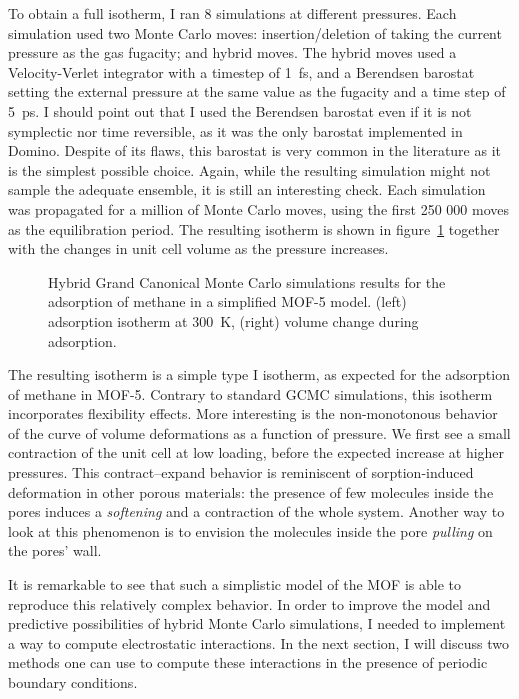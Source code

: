 \documentclass[thesis]{subfiles}
\begin{document}
To obtain a full isotherm, I ran 8 simulations at different  pressures.
Each simulation used two Monte Carlo moves: insertion/deletion of 
taking the current pressure as the gas fugacity; and hybrid moves. The hybrid
moves used a Velocity-Verlet integrator with a timestep of \SI{1}{fs}, and a
Berendsen barostat setting the external pressure at the same value as the
 fugacity and a time step of \SI{5}{ps}. I should point out that I used
the Berendsen barostat even if it is not symplectic nor time reversible, as it
was the only barostat implemented in Domino. Despite of its flaws, this barostat
is very common in the literature as it is the simplest possible choice. Again,
while the resulting simulation might not sample the adequate ensemble, it is
still an interesting check. Each simulation was propagated for a million of
Monte Carlo moves, using the first 250 000 moves as the equilibration period.
The resulting isotherm is shown in figure~\ref{fig:hmc-mof5} together with the
changes in unit cell volume as the pressure increases.

\begin{figure}[ht]
    \centering
    
    \caption{Hybrid Grand Canonical Monte Carlo simulations results for the
    adsorption of methane in a simplified MOF-5 model. (left) adsorption
    isotherm at \SI{300}{K}, (right) volume change during adsorption.}
    \label{fig:hmc-mof5}
\end{figure}

The resulting isotherm is a simple type I isotherm, as expected for the
adsorption of methane in MOF-5. Contrary to standard GCMC simulations, this
isotherm incorporates flexibility effects. More interesting is the non-monotonous
behavior of the curve of volume deformations as a function of pressure. We first
see a small contraction of the unit cell at low loading, before the expected
increase at higher pressures. This contract--expand behavior is reminiscent of
sorption-induced deformation in other porous materials\cite{Balzer2013,
Mouhat2015}: the presence of few molecules inside the pores induces a
\emph{softening} and a contraction of the whole system. Another way to look at
this phenomenon is to envision the molecules inside the pore \emph{pulling} on
the pores' wall.

It is remarkable to see that such a simplistic model of the MOF is able to
reproduce this relatively complex behavior. In order to improve the model and
predictive possibilities of hybrid Monte Carlo simulations, I needed to
implement a way to compute electrostatic interactions. In the next section, I
will discuss two methods one can use to compute these interactions in the
presence of periodic boundary conditions.
\end{document}
